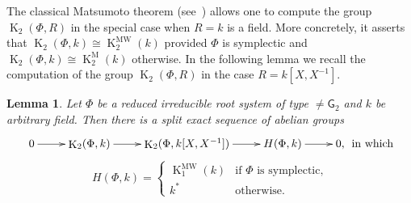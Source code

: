 \documentclass[oneside, 8pt]{amsart}
\newtheorem{lemma}{Lemma}
\theoremstyle{remark}
\theoremstyle{definition}
\numberwithin{lemma}{section}
\numberwithin{prop}{section}
\numberwithin{corollary}{section}
\DeclareMathOperator{\K}{K}
\newcommand{\inv}{^{-1}}
\newcommand{\rG}{\mathsf{G}}
\numberwithin{equation}{section}
\begin{document}
\begin{comment}
Suppose for a moment that $\langle \alpha, \beta \rangle = -1$ and  $\langle \beta, \alpha \rangle = -1$ then
\[ \{s, t^{-1} \} = \{s,  t^{-1}\}_\alpha = \{t, s^{-1} \}_\beta^{-1} = \{s^{-1}, t\} \]
In particular, $\{s, s^{-1}\} = \{s, s^{-1}\}^{-1}$ 
\end{comment}
The classical Matsumoto theorem (see~\cite[Theorem~5.10]{Ma69}) allows one to compute the group $\K_2(\Phi, R)$ in the special case when $R=k$ is a field. More concretely, it asserts that $\K_2(\Phi, k) \cong \K_2^\mathrm{MW}(k)$ provided $\Phi$ is symplectic and  $\K_2(\Phi, k) \cong \K_2^\mathrm{M}(k)$ otherwise. In the following lemma we 
recall the computation of the group $\K_2(\Phi, R)$ in the case $R=k[X, X\inv]$.
\begin{lemma}\label{K2-laurent-field} Let $\Phi$ be a reduced irreducible root system of type $\neq \rG_2$ and $k$ be arbitrary field. Then there is a split exact sequence of abelian groups
\[ \xymatrix{ 0 \ar[r] & \K_2(\Phi, k) \ar[r] & \K_2(\Phi, k[X, X^{-1}]) \ar[r] & H(\Phi, k) \ar[r] & 0,}\text{ in which} \]
\[ H(\Phi, k) = \left\{\begin{array}{ll} \K_1^\mathrm{MW}(k)& \text{if $\Phi$ is symplectic,}\\ k^* & \text{otherwise.}  \end{array}\right. \]  \end{lemma}
\end{document}

